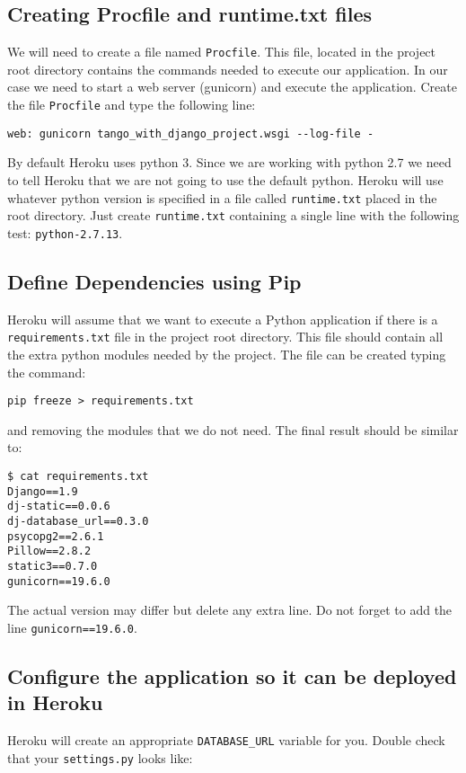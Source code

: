\documentclass[12pt]{article} %
\begin{document}
\subsection{Creating Procfile and runtime.txt files}

We will need to create a file named \texttt{Procfile}. This file, located in the project root directory contains the commands needed to execute our application. In our case we need to start a web server (gunicorn) and execute the application. Create the file \texttt{Procfile} and type the following line:

\begin{verbatim}
web: gunicorn tango_with_django_project.wsgi --log-file -
\end{verbatim}

By default Heroku uses python 3. Since we are working with python 2.7 we need to tell Heroku that we are not going to use the default python. Heroku will use whatever python version is specified in a file called \texttt{runtime.txt} placed in the root directory. Just create \texttt{runtime.txt} containing a single line with the following test: \texttt{python-2.7.13}.

\subsection{Define Dependencies using Pip}

Heroku will assume that we want to execute a Python application if there is a \texttt{requirements.txt} file in the project root directory. This file should contain all the extra python modules needed by the project. The file can be created typing the command:

\begin{verbatim}
pip freeze > requirements.txt
\end{verbatim}

and removing the modules that we do not need. The final result should be similar to:

\begin{verbatim}
$ cat requirements.txt 
Django==1.9
dj-static==0.0.6
dj-database_url==0.3.0
psycopg2==2.6.1
Pillow==2.8.2
static3==0.7.0
gunicorn==19.6.0
\end{verbatim}
The actual version may differ but delete any extra line. Do not forget to add the line \texttt{gunicorn==19.6.0}.

\subsection{Configure the application so it can be deployed in Heroku}
Heroku will create an appropriate \texttt{DATABASE\_URL} variable for you. Double check that your \texttt{settings.py} looks like:
\end{document}
